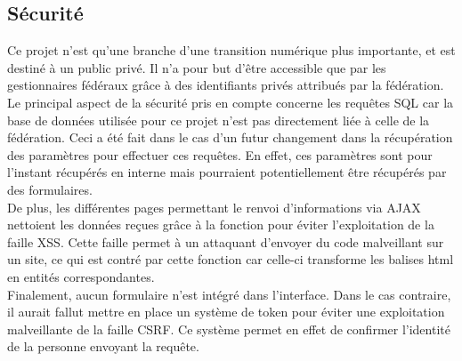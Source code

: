 \subsection{Sécurité}
\vspace{1cm}

Ce projet n’est qu’une branche d’une transition numérique plus importante, et est destiné à un public privé. Il n’a pour but d’être accessible que par les gestionnaires fédéraux grâce à des identifiants privés attribués par la fédération. \\

Le principal aspect de la sécurité pris en compte concerne les requêtes SQL car la base de données utilisée pour ce projet n’est pas directement liée à celle de la fédération. 
Ceci a été fait dans le cas d’un futur changement dans la récupération des paramètres pour effectuer ces requêtes. En effet, ces paramètres sont pour l’instant récupérés en interne mais pourraient potentiellement être récupérés par des formulaires.\\

De plus, les différentes pages permettant le renvoi d’informations via AJAX nettoient les données reçues grâce à la fonction  pour éviter l’exploitation de la faille XSS. Cette faille permet à un attaquant d’envoyer du code malveillant sur un site, ce qui est contré par cette fonction car celle-ci transforme les balises html en entités correspondantes.\\

Finalement, aucun formulaire n’est intégré dans l’interface. Dans le cas contraire, il aurait fallut mettre en place un système de token pour éviter une exploitation malveillante de la faille CSRF. Ce système permet en effet de confirmer l’identité de la personne envoyant la requête.